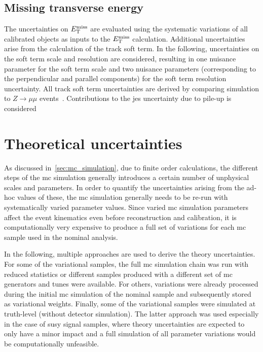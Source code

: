 \subsection{Missing transverse energy}

The uncertainties on $E_{\textrm{T}}^{\textrm{miss}}$ are evaluated using the systematic variations of all calibrated objects as inputs to the $E_{\textrm{T}}^{\textrm{miss}}$ calculation. Additional uncertainties arise from the calculation of the track soft term. In the following, uncertainties on the soft term scale and resolution are considered, resulting in one nuisance parameter for the soft term scale and two nuisance parameters (corresponding to the perpendicular and parallel components) for the soft term resolution uncertainty. All track soft term uncertainties are derived by comparing simulation to $Z\rightarrow\mu\mu$ events~\cite{PERF-2016-07}. Contributions to the \gls{jes} uncertainty due to pile-up is considered 	

\section{Theoretical uncertainties}

As discussed in~\cref{sec:mc_simulation}, due to finite order calculations, the different steps of the \gls{mc} simulation generally introduces a certain number of unphysical scales and parameters. In order to quantify the uncertainties arising from the ad-hoc values of these, the \gls{mc} simulation generally needs to be re-run with systematically varied parameter values. Since varied \gls{mc} simulation parameters affect the event kinematics even before reconstruction and calibration, it is computationally very expensive to produce a full set of variations for each \gls{mc} sample used in the nominal analysis.

In the following, multiple approaches are used to derive the theory uncertainties. For some of the variational samples, the full \gls{mc} simulation chain was run with reduced statistics or different samples produced with a different set of \gls{mc} generators and tunes were available. For others, variations were already processed during the initial \gls{mc} simulation of the nominal sample and subsequently stored as variational weights. Finally, some of the variational samples were simulated at truth-level (\ie without detector simulation). The latter approach was used especially in the case of \gls{susy} signal samples, where theory uncertainties are expected to only have a minor impact and a full simulation of all parameter variations would be computationally unfeasible. 

